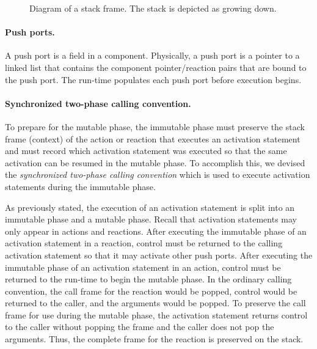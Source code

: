 \begin{figure}
\centering
{}%
\caption{Diagram of a stack frame\label{frame}.  The stack is depicted as growing down.}
\end{figure}

\paragraph{Push ports.}
A push port is a field in a component.
Physically, a push port is a pointer to a linked list that contains the component pointer/reaction pairs that are bound to the push port.
The run-time populates each push port before execution begins.

\paragraph{Synchronized two-phase calling convention.}
To prepare for the mutable phase, the immutable phase must preserve the stack frame (context) of the action or reaction that executes an activation statement and must record which activation statement was executed so that the same activation can be resumed in the mutable phase.
To accomplish this, we devised the \emph{synchronized two-phase calling convention} which is used to execute activation statements during the immutable phase.

As previously stated, the execution of an activation statement is split into an immutable phase and a mutable phase.
Recall that activation statements may only appear in actions and reactions.
After executing the immutable phase of an activation statement in a reaction, control must be returned to the calling activation statement so that it may activate other push ports.
After executing the immutable phase of an activation statement in an action, control must be returned to the run-time to begin the mutable phase.
In the ordinary calling convention, the call frame for the reaction would be popped, control would be returned to the caller, and the arguments would be popped.
To preserve the call frame for use during the mutable phase, the activation statement returns control to the caller without popping the frame and the caller does not pop the arguments.
Thus, the complete frame for the reaction is preserved on the stack.

